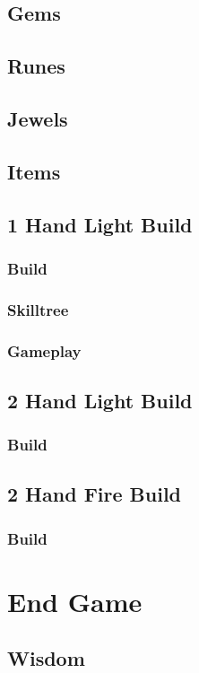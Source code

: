 \documentclass[12pt]{article}
\begin{document}
\subsection{Gems}
\subsection{Runes}
\subsection{Jewels}
\subsection{Items}
\subsection{1 Hand Light Build}
\subsubsection{Build}
\subsubsection{Skilltree}
\subsubsection{Gameplay}
\subsection{2 Hand Light Build}
\subsubsection{Build}
\subsection{2 Hand Fire Build}
\subsubsection{Build}

\newpage


\section{End Game}
\subsection{Wisdom}
\end{document}
